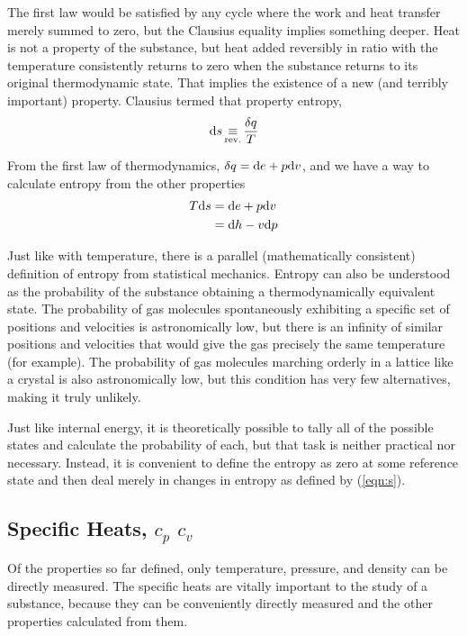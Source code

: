 The first law would be satisfied by any cycle where the work and heat transfer merely summed to zero, but the Clausius equality implies something deeper.  Heat is not a property of the substance, but heat added reversibly in ratio with the temperature consistently returns to zero when the substance returns to its original thermodynamic state.  That implies the existence of a new (and terribly important) property.  Clausius termed that property entropy,
\begin{align}
\mathrm{d} s \operatorname*{\equiv}_\mathrm{rev.} \frac{\delta q}{T}\label{eqn:s}
\end{align}

From the first law of thermodynamics, $\delta q = \mathrm{d} e + p \mathrm{d} v$, and we have a way to calculate entropy from the other properties
\begin{align}
T \mathrm{d} s &= \mathrm{d} e + p\mathrm{d} v\label{eqn:intro:ds1}\\
 &= \mathrm{d} h - v \mathrm{d} p\label{eqn:intro:ds2}
\end{align}

Just like with temperature, there is a parallel (mathematically consistent) definition of entropy from statistical mechanics.  Entropy can also be understood as the probability of the substance obtaining a thermodynamically equivalent state.  The probability of gas molecules spontaneously exhibiting a specific set of positions and velocities is astronomically low, but there is an infinity of similar positions and velocities that would give the gas precisely the same temperature (for example).  The probability of gas molecules marching orderly in a lattice like a crystal is also astronomically low, but this condition has very few alternatives, making it truly unlikely.

Just like internal energy, it is theoretically possible to tally all of the possible states and calculate the probability of each, but that task is neither practical nor necessary.  Instead, it is convenient to define the entropy as zero at some reference state and then deal merely in changes in entropy as defined by (\ref{eqn:s}).

\subsection{Specific Heats, $c_p$ $c_v$}\label{sec:intro:c}

Of the properties so far defined, only temperature, pressure, and density can be directly measured.  The specific heats are vitally important to the study of a substance, because they can be conveniently directly measured and the other properties calculated from them.

